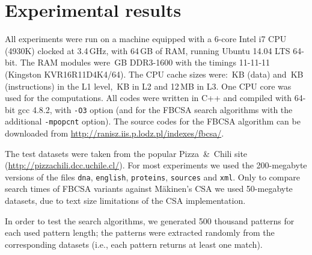 \documentclass{cai}
\begin{document}
\section{Experimental results}

All experiments were run on a machine equipped with a 6-core Intel i7 CPU
(4930K) clocked at 3.4\,GHz, with 64\,GB of RAM, 
running Ubuntu 14.04 LTS 64-bit.
The RAM modules were \,GB DDR3-1600 with the timings 11-11-11 
(Kingston KVR16R11D4K4/64).
The CPU cache sizes were:
\,KB (data) and \,KB (instructions) in the L1 level,
\,KB in L2 and 12\,MB in L3.
One CPU core was used for the computations.
All codes were written in C++ and compiled with 64-bit gcc 4.8.2, 
with \texttt{-O3} option
(and for the FBCSA search algorithms with the additional \texttt{-mpopcnt} option).
The source codes for the FBCSA algorithm can be downloaded from \url{http://ranisz.iis.p.lodz.pl/indexes/fbcsa/}.

The test datasets were taken from the popular Pizza~\&~Chili 
site (\url{http://pizzachili.dcc.uchile.cl/}).
For most experiments we used the 200-megabyte versions of the files \texttt{dna},
\texttt{english}, \texttt{proteins}, \texttt{sources} and \texttt{xml}.
Only to compare search times of FBCSA variants against M{\"a}kinen's CSA
we used 50-megabyte datasets, due to text size limitations of the 
CSA implementation.

In order to test the search algorithms, we generated 500 thousand patterns 
for each used pattern length; the patterns were extracted randomly from the 
corresponding datasets (i.e., each pattern returns at least one match).
\end{document}
